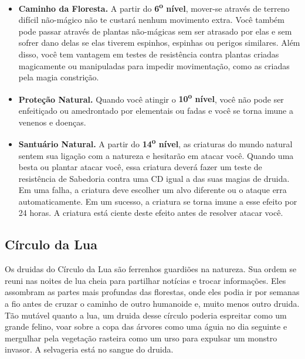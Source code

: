 \documentclass[a4paper,12p]{book}
\begin{document}
{\begin{multicols}{2}
\begin{itemize}
				Uma vez que você tenha acesso a uma magia de círculo, você sempre poderá prepará-la e ela não conta no número de magias que você pode preparar a cada dia. Se você tiver acesso a uma magia que não aparece na lista de magias de druida, a magia, no entanto, será uma magia de druida para você.

				\item \textbf{Caminho da Floresta.} A partir do \textbf{6\textsuperscript{o} nível}, mover-se através de terreno difícil não-mágico não te custará nenhum movimento extra. Você também pode passar através de plantas não-mágicas sem ser atrasado por elas e sem sofrer dano delas se elas tiverem espinhos, espinhas ou perigos similares.
				Além disso, você tem vantagem em testes de resistência contra plantas criadas magicamente ou manipuladas para impedir movimentação, como as criadas pela magia constrição.
				
				\item \textbf{Proteção Natural.} Quando você atingir o \textbf{10\textsuperscript{o} nível}, você não pode ser enfeitiçado ou amedrontado por elementais ou fadas e você se torna imune a venenos e doenças.
				
				\item \textbf{Santuário Natural.} A partir do \textbf{14\textsuperscript{o} nível}, as criaturas do mundo natural sentem sua ligação com a natureza e hesitarão em atacar você. Quando uma besta ou plantar atacar você, essa criatura deverá fazer um teste de resistência de Sabedoria contra uma CD igual a das suas magias de druida. Em uma falha, a criatura deve escolher um alvo diferente ou o ataque erra automaticamente. Em um sucesso, a criatura se torna imune a esse efeito por 24 horas.
				A criatura está ciente deste efeito antes de resolver atacar você.
				
				\end{itemize}
			\end{multicols}
		
			
			\subsection{Círculo da Lua}
			Os druidas do Círculo da Lua são ferrenhos guardiões na natureza. Sua ordem se reuni nas noites de lua cheia para partilhar notícias e trocar informações. Eles assombram as partes mais profundas das florestas, onde eles podia ir por semanas a fio antes de cruzar o caminho de outro humanoide e, muito menos outro druida.
			Tão mutável quanto a lua, um druida desse círculo poderia espreitar como um grande felino, voar sobre a copa das árvores como uma águia no dia seguinte e mergulhar pela vegetação rasteira como um urso para expulsar um monstro invasor. A selvageria está no sangue do druida.
			
}
\end{document}
